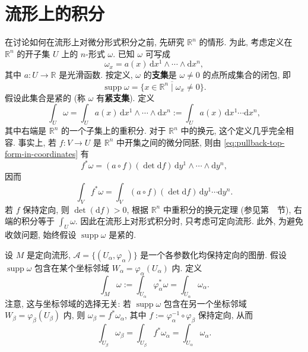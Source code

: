 \section{流形上的积分}\label{sec:integration-on-manifolds}

在讨论如何在流形上对微分形式积分之前, 先研究 $\mathbb{R}^n$ 的情形. 为此, 考虑定义在 $\mathbb{R}^n$ 的开子集 $U$ 上的 $n$-形式 $\omega$. 已知 $\omega$ 可写成
\[
  \omega_x=a(x)\,\mathrm{d}x^1\wedge\cdots\wedge\mathrm{d}x^n,
\]
其中 $a:U\to\mathbb{R}$ 是光滑函数. 按定义, $\omega$ 的\textbf{支集}是 $\omega\ne0$ 的点所成集合的闭包, 即
\[
  \operatorname{supp}\omega=\overline{\{x\in\mathbb{R}^n\mid\omega_x\ne0\}}.
\]
假设此集合是紧的 (称 $\omega$ 有\textbf{紧支集}). 定义
\[
  \int_U\omega=\int_U a(x)\,\mathrm{d}x^1\wedge\cdots\wedge\mathrm{d}x^n
  :=\int_U a(x)\,\mathrm{d}x^1\cdots\mathrm{d}x^n,
\]
其中右端是 $\mathbb{R}^n$ 的一个子集上的重积分. 对于 $\mathbb{R}^n$ 中的换元, 这个定义几乎完全相容. 事实上, 若 $f:V\to U$ 是 $\mathbb{R}^n$ 中开集之间的微分同胚, 则由 \eqref{eq:pullback-top-form-in-coordinates} 有
\[
  f^*\omega=(a\circ f)(\det\mathrm{d}f)\,\mathrm{d}y^1\wedge\cdots\wedge\mathrm{d}y^n,
\]
因而
\[
  \int_Vf^*\omega=\int_V(a\circ f)(\det\mathrm{d}f)\,\mathrm{d}y^1\cdots\mathrm{d}y^n.
\]
若 $f$ 保持定向, 则 $\det(\mathrm{d}f)>0$, 根据 $\mathbb{R}^n$ 中重积分的换元定理 (参见第~~节), 右端的积分等于 $\int_U\omega$. 因此在流形上对形式积分时, 只考虑可定向流形. 此外, 为避免收敛问题, 始终假设 $\operatorname{supp}\omega$ 是紧的.

设 $M$ 是定向流形, $\mathcal{A}=\{(U_\alpha,\varphi_\alpha)\}$ 是一个各参数化均保持定向的图册. 假设 $\operatorname{supp}\omega$ 包含在某个坐标邻域 $W_\alpha=\varphi_\alpha(U_\alpha)$ 内. 定义
\[
  \int_M\omega:=\int_{U_\alpha}\varphi_\alpha^*\omega=\int_{U_\alpha}\omega_\alpha.
\]
注意, 这与坐标邻域的选择无关: 若 $\operatorname{supp}\omega$ 包含在另一个坐标邻域 $W_\beta=\varphi_\beta(U_\beta)$ 内, 则 $\omega_\beta=f^*\omega_\alpha$, 其中 $f:=\varphi_\alpha^{-1}\circ\varphi_\beta$ 保持定向, 从而
\[
  \int_{U_\beta}\omega_\beta=\int_{U_\beta}f^*\omega_\alpha=\int_{U_\alpha}\omega_\alpha.
\]

